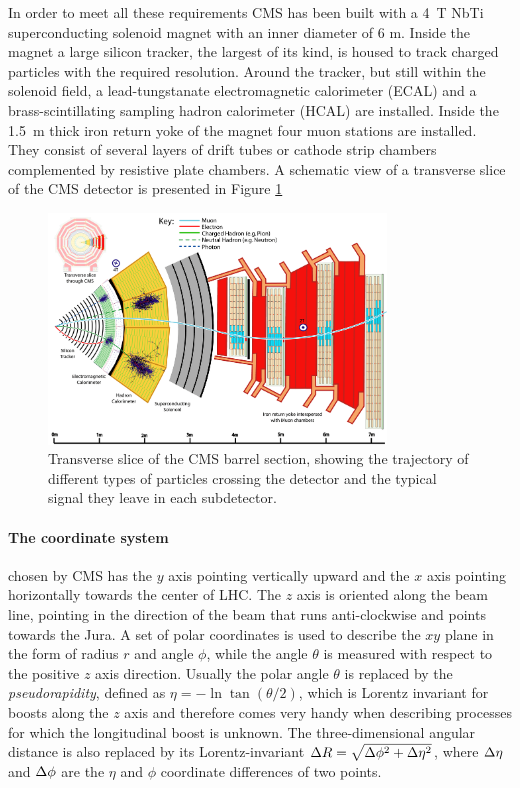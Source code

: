 In order to meet all these requirements CMS has been built with a 4~T NbTi superconducting solenoid magnet with an inner diameter of 6 m. Inside the magnet a large silicon tracker, the largest of its kind, is housed to track charged particles with the required resolution. Around the tracker, but still within the solenoid field, a lead-tungstanate electromagnetic calorimeter (ECAL) and a brass-scintillating sampling hadron calorimeter (HCAL) are installed. Inside the 1.5~m thick iron return yoke of the magnet four muon stations are installed. They consist of several layers of drift tubes or cathode strip chambers complemented by resistive plate chambers. A schematic view of a transverse slice of the CMS detector is presented in Figure \ref{fig:cmsdet}

\begin{figure}
\begin{center}
\includegraphics[angle=-0,width=0.8\textwidth]{2_LHC_and_CMS/pics/CMS_Slice_HD.png}
\caption{Transverse slice of the CMS barrel section, showing the trajectory of different types of particles crossing the detector and the typical signal they leave in each subdetector.
\label{fig:cmsdet}
}
\end{center}
\end{figure}


\paragraph{The coordinate system}
chosen by CMS has the $y$ axis pointing vertically upward and the $x$ axis pointing horizontally towards the center of LHC. The $z$ axis is oriented along the beam line, pointing in the direction of the beam that runs anti-clockwise and points towards the Jura. A set of polar coordinates is used to describe the $xy$ plane in the form of radius $r$ and angle $\phi$, while the angle $\theta$ is measured with respect to the positive $z$ axis direction. Usually the polar angle $\theta$ is replaced by the \emph{pseudorapidity}, defined as $\eta=-\ln \tan(\theta/2)$, which is Lorentz invariant for boosts along the $z$ axis and therefore comes very handy when describing processes for which the longitudinal boost is unknown. The three-dimensional angular distance is also replaced by its Lorentz-invariant $\Delta R=\sqrt{\Delta\phi^2+\Delta\eta^2}$, where $\Delta\eta$ and $\Delta\phi$ are the $\eta$ and $\phi$ coordinate differences of two points.

